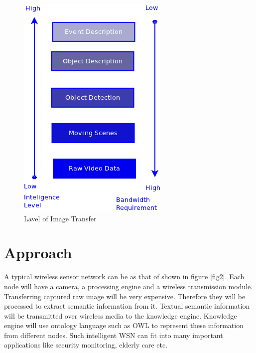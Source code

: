 \begin{figure}
\begin{center}
 \includegraphics{../Figures/image_tr_level.png}
 \caption{Lavel of Image Transfer}
 \label{fig1}
\end{center} 
\end{figure} 


\section{Approach}

A typical wireless sensor network can be as that of shown in figure
\ref{fig2}. Each node will have a camera, a processing engine and a
wireless transmission module. Transferring captured raw image will be
very expensive. Therefore they will be processed to
extract semantic information from it. Textual semantic information will
be transmitted over wireless media to the knowledge engine. Knowledge
engine will use ontology language such as OWL to represent these
information from different nodes. Such intelligent WSN can fit into many
important applications like security monitoring, elderly care etc.


